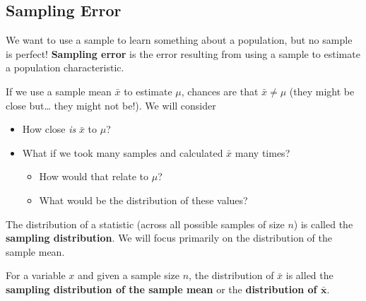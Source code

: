 \documentclass[
]{book}
\providecommand{\tightlist}{%
  \setlength{\itemsep}{0pt}\setlength{\parskip}{0pt}}
\begin{document}
\hypertarget{sampling-error}{%
\subsection{Sampling Error}\label{sampling-error}}

We want to use a sample to learn something about a population, but no sample is perfect! \textbf{Sampling error} is the error resulting from using a sample to estimate a population characteristic.

If we use a sample mean \(\bar{x}\) to estimate \(\mu\), chances are that \(\bar{x}\ne\mu\) (they might be close but\ldots{} they might not be!). We will consider

\begin{itemize}
\tightlist
\item
  How close \emph{is} \(\bar{x}\) to \(\mu\)?
\item
  What if we took many samples and calculated \(\bar{x}\) many times?

  \begin{itemize}
  \tightlist
  \item
    How would that relate to \(\mu\)?
  \item
    What would be the distribution of these values?
  \end{itemize}
\end{itemize}

The distribution of a statistic (across all possible samples of size \(n\)) is called the \textbf{sampling distribution}. We will focus primarily on the distribution of the sample mean.

For a variable \(x\) and given a sample size \(n\), the distribution of \(\bar{x}\) is alled the \textbf{sampling distribution of the sample mean} or the \textbf{distribution of \(\boldsymbol{\bar{x}}\)}.
\end{document}
